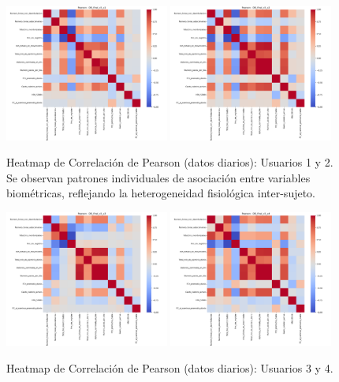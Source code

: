 \documentclass[12pt,letterpaper,twoside]{report}
\begin{document}
\begin{calculobox}
\begin{figure}[htbp]
\centering
\includegraphics[width=0.48\textwidth]{figuras/DB_final_v3_u1_heatmap_pearson.png}
\includegraphics[width=0.48\textwidth]{figuras/DB_final_v3_u2_heatmap_pearson.png}
\caption{Heatmap de Correlación de Pearson (datos diarios): Usuarios 1 y 2. Se observan patrones individuales de asociación entre variables biométricas, reflejando la heterogeneidad fisiológica inter-sujeto.}
\label{fig:corr_heatmap_u1_u2}
\end{figure}

\begin{figure}[htbp]
\centering
\includegraphics[width=0.48\textwidth]{figuras/DB_final_v3_u3_heatmap_pearson.png}
\includegraphics[width=0.48\textwidth]{figuras/DB_final_v3_u4_heatmap_pearson.png}
\caption{Heatmap de Correlación de Pearson (datos diarios): Usuarios 3 y 4.}
\label{fig:corr_heatmap_u3_u4}
\end{figure}


\end{calculobox}
\end{document}
